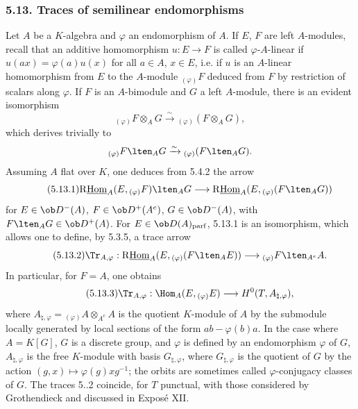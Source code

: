 \subsubsection*{5.13. Traces of semilinear endomorphisms}

Let $A$ be a $K$-algebra and $\varphi$ an endomorphism of $A$. If $E$, $F$ are left $A$-modules, recall that an additive homomorphism $u:E\to F$ is called $\varphi$-$A$-linear if $u(ax)=\varphi(a)u(x)$ for all $a\in A$, $x\in E$, i.e. if $u$ is an $A$-linear homomorphism from $E$ to the $A$-module ${}_{(\varphi)}F$ deduced from $F$ by restriction of scalars along $\varphi$. If $F$ is an $A$-bimodule and $G$ a left $A$-module, there is an evident isomorphism
\[
{}_{(\varphi)}F\otimes_AG\xrightarrow{\sim}{}_{(\varphi)}(F\otimes_AG),
\]
which derives trivially to
\[
{}_{(\varphi)}F\lten_AG\xrightarrow{\sim}{}_{(\varphi)}(F\lten_AG).
\]
Assuming $A$ flat over $K$, one deduces from 5.4.2 the arrow
\begin{equation}\tag{5.13.1}
\mathrm{R}\underline{\mathrm{Hom}}_A(E,{}_{(\varphi)}F)\lten_AG\longrightarrow\mathrm{R}\underline{\mathrm{Hom}}_A(E,{}_{(\varphi)}(F\lten_AG))
\end{equation}
for $E\in\ob D^-(A)$, $F\in\ob D^+(A^e)$, $G\in\ob D^-(A)$, with $F\lten_AG\in\ob D^+(A)$. For $E\in\ob D(A)_{\mathrm{parf}}$, 5.13.1 is an isomorphism, which allows one to define, by 5.3.5, a trace arrow
\begin{equation}\tag{5.13.2}
\Tr_{A,\varphi}:\mathrm{R}\underline{\mathrm{Hom}}_A(E,{}_{(\varphi)}(F\lten_AE))\longrightarrow {}_{(\varphi)}F\lten_{A^e}A.
\end{equation}
In particular, for $F=A$, one obtains
\begin{equation}\tag{5.13.3}
\Tr_{A,\varphi}:\Hom_A(E,{}_{(\varphi)}E)\longrightarrow H^0(T,A_{\natural,\varphi}),
\end{equation}
where $A_{\natural,\varphi}={}_{(\varphi)}A\otimes_{A^e}A$ is the quotient $K$-module of $A$ by the submodule locally generated by local sections of the form $ab-\varphi(b)a$. In the case where $A=K[G]$, $G$ is a discrete group, and $\varphi$ is defined by an endomorphism $\varphi$ of $G$, $A_{\natural,\varphi}$ is the free $K$-module with basis $G_{\natural,\varphi}$, where $G_{\natural,\varphi}$ is the quotient of $G$ by the action $(g,x)\mapsto\varphi(g)xg^{-1}$; the orbits are sometimes called $\varphi$-conjugacy classes of $G$. The traces 5..2 coincide, for $T$ punctual, with those considered by Grothendieck and discussed in Exposé XII.

